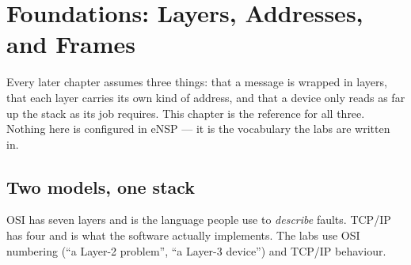 \chapter{Foundations: Layers, Addresses, and Frames}
\label{ch:foundations}

Every later chapter assumes three things: that a message is wrapped in
layers, that each layer carries its own kind of address, and that a
device only reads as far up the stack as its job requires. This chapter
is the reference for all three. Nothing here is configured in eNSP ---
it is the vocabulary the labs are written in.

\section{Two models, one stack}
OSI has seven layers and is the language people use to \emph{describe}
faults. TCP/IP has four and is what the software actually implements.
The labs use OSI numbering (``a Layer-2 problem'', ``a Layer-3 device'')
and TCP/IP behaviour.

